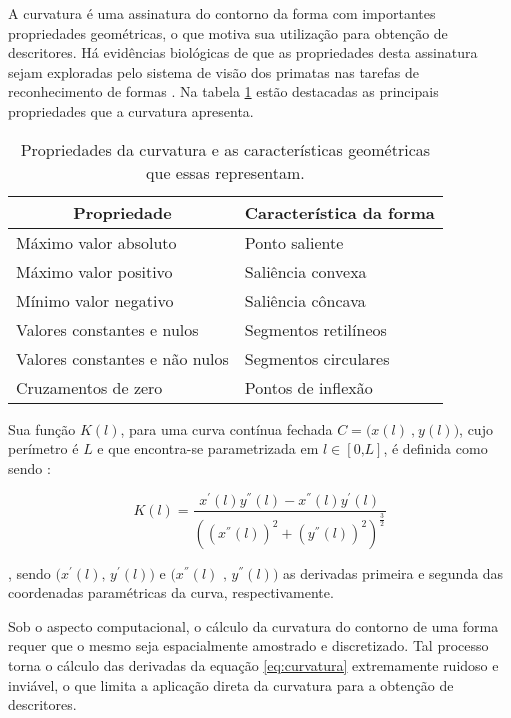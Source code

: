 A curvatura é uma assinatura do contorno da forma com importantes propriedades geométricas, o que motiva sua utilização para obtenção de descritores. Há evidências biológicas de que as propriedades desta assinatura sejam exploradas pelo sistema de visão dos primatas nas tarefas de reconhecimento de formas \cite{Costa:2009}. Na tabela \ref{tbl:curv} estão destacadas as principais propriedades que a curvatura apresenta.  

\begin{table}
\centering
\caption{\label{tbl:curv} Propriedades da curvatura e as características geométricas que essas representam.}
\begin{tabular}[]{ll}
\toprule
\multicolumn{1}{c|}{Propriedade} & \multicolumn{1}{c}{Característica da forma}\\ 
\hline
Máximo valor absoluto & Ponto saliente \\
Máximo valor positivo & Saliência convexa \\
Mínimo valor negativo & Saliência côncava \\
Valores constantes e nulos & Segmentos retilíneos \\
Valores constantes e não nulos & Segmentos circulares \\
Cruzamentos de zero & Pontos de inflexão \\ \bottomrule
\end{tabular}
\end{table}

Sua função $K(l)$, para uma curva contínua fechada $C = \big(x(l)\:\text{,}\:y(l)\big)$,  cujo perímetro é $L$ e que encontra-se parametrizada em $l \in [0\text{,}L]$, é definida como sendo \cite{Kindratenko:2003}:

\begin{equation} \label{eq:curvatura}
K(l) = \frac{x^{'}(l)y^{''}(l)-x^{''}(l)y^{'}(l)}{((x^{''}(l))^{2}+(y^{''}(l))^{2})^{\frac{3}{2}}}
\end{equation}

, sendo $\big(x^{'}(l) \text{, }y^{'}(l)\big)$ e $\big(x^{''}(l)\text{ , }y^{''}(l)\big)$ as derivadas primeira e segunda das coordenadas paramétricas da curva, respectivamente.

Sob o aspecto computacional, o cálculo da curvatura do contorno de uma forma requer que o mesmo seja espacialmente amostrado e discretizado. Tal processo torna o cálculo das derivadas da equação \ref{eq:curvatura} extremamente ruidoso e inviável, o que limita a aplicação direta da curvatura para a obtenção de descritores. 

